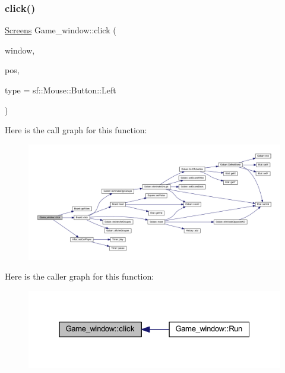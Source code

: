 \subsubsection{\texorpdfstring{click()}{click()}}
{\footnotesize\ttfamily \hyperlink{_globals_8h_a3d5776bab98402b03be09156bacf4f68}{Screens} Game\+\_\+window\+::click (\begin{DoxyParamCaption}\item[{const sf\+::\+Render\+Window \&}]{window,  }\item[{sf\+::\+Vector2i}]{pos,  }\item[{const sf\+::\+Mouse\+::\+Button \&}]{type = {\ttfamily sf\+:\+:Mouse\+:\+:Button\+:\+:Left} }\end{DoxyParamCaption})}

Here is the call graph for this function\+:
\nopagebreak
\begin{figure}[H]
\begin{center}
\leavevmode
\includegraphics[width=350pt]{class_game__window_afa942088809bf10731bb31d0d37b878d_cgraph}
\end{center}
\end{figure}
Here is the caller graph for this function\+:
\nopagebreak
\begin{figure}[H]
\begin{center}
\leavevmode
\includegraphics[width=325pt]{class_game__window_afa942088809bf10731bb31d0d37b878d_icgraph}
\end{center}
\end{figure}
\mbox{\label{class_game__window_aafdea9d00265261abfac6ad233b54638}} 
